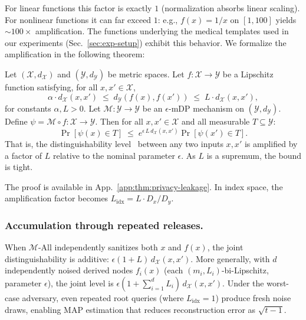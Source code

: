 For linear functions this factor is exactly $1$ (normalization absorbs linear scaling). For nonlinear functions it can far exceed $1$: e.g., $f(x) = 1/x$ on $[1, 100]$ yields ${\sim}100\times$ amplification. The functions underlying the medical templates used in our experiments (Sec.~\ref{sec:exp-setup}) exhibit this behavior. We formalize the amplification in the following theorem:

\begin{theorem}
\label{thm:privacy-leakage}
Let $(\mathcal{X}, d_{\mathcal{X}})$ and 
$(\mathcal{Y}, d_{\mathcal{Y}})$ be metric spaces. Let 
$f\colon \mathcal{X} \to \mathcal{Y}$ be a Lipschitz function 
satisfying, for all $x, x' \in \mathcal{X}$,
\[
    \alpha \cdot d_{\mathcal{X}}(x, x') 
    \;\leq\; 
    d_{\mathcal{Y}}(f(x), f(x')) 
    \;\leq\; L \cdot d_{\mathcal{X}}(x, x'),
\]
for constants $\alpha, L > 0$. Let $\mathcal{M}\colon \mathcal{Y} \to \mathcal{Y}$ be an $\epsilon$-mDP mechanism on $(\mathcal{Y}, d_{\mathcal{Y}})$. Define $\psi = \mathcal{M} \circ f \colon \mathcal{X} \to \mathcal{Y}$. Then for all $x, x' \in \mathcal{X}$ and all measurable $T \subseteq \mathcal{Y}$:
\[
    \Pr[\psi(x) \in T] 
    \;\leq\; 
    e^{\epsilon\, L\, d_{\mathcal{X}}(x, x')} 
    \Pr[\psi(x') \in T].
\]
That is, the distinguishability level~\cite{Chatzikokolakis2013BroadeningTS} between any two inputs $x, x'$ is amplified by a factor of $L$ relative to the nominal parameter $\epsilon$. As $L$ is a supremum, the bound is tight.
\end{theorem}
 
The proof is available in App.~\ref{app:thm:privacy-leakage}. In index space, the amplification factor becomes $L_{\mathrm{idx}} = L \cdot D_x / D_y$.

\subsubsection{Accumulation through repeated releases.}
\label{sec:redundancy-noising}
 
When $\mathcal{M}$-All independently sanitizes both $x$ and $f(x)$, the joint distinguishability is additive: $\epsilon(1 + L)\,d_\mathcal{X}(x,x')$. More generally, with $d$ independently noised derived nodes $f_i(x)$ (each $(m_i, L_i)$-bi-Lipschitz, parameter $\epsilon$), the joint level is $\epsilon(1 + \sum_{i=1}^{d} L_i)\,d_\mathcal{X}(x,x')$. Under the worst-case adversary, even repeated root queries (where $L_{\mathrm{idx}} = 1$) produce fresh noise draws, enabling MAP estimation that reduces reconstruction error as $\sqrt{t{-}1}$.
 
